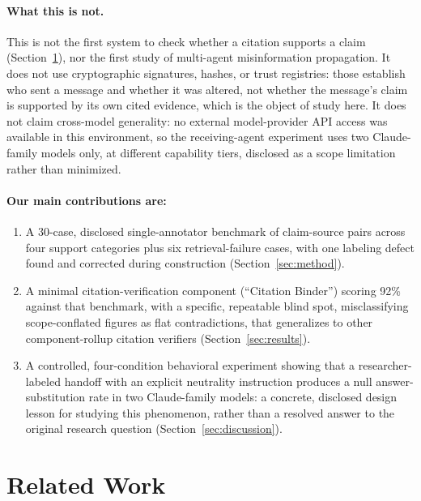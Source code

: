 \documentclass[11pt]{article}
\begin{document}
\paragraph{What this is not.} This is not the first system to check whether a
citation supports a claim (Section~\ref{sec:related}), nor the first study of
multi-agent misinformation propagation. It does not use cryptographic signatures,
hashes, or trust registries: those establish who sent a message and whether it was
altered, not whether the message's claim is supported by its own cited evidence,
which is the object of study here. It does not claim cross-model generality: no
external model-provider API access was available in this environment, so the
receiving-agent experiment uses two Claude-family models only, at different
capability tiers, disclosed as a scope limitation rather than minimized.

\paragraph{Our main contributions are:}
\begin{enumerate}
\item A 30-case, disclosed single-annotator benchmark of claim-source pairs across
four support categories plus six retrieval-failure cases, with one labeling defect
found and corrected during construction (Section~\ref{sec:method}).
\item A minimal citation-verification component (``Citation Binder'') scoring 92\%
against that benchmark, with a specific, repeatable blind spot, misclassifying
scope-conflated figures as flat contradictions, that generalizes to other
component-rollup citation verifiers (Section~\ref{sec:results}).
\item A controlled, four-condition behavioral experiment showing that a
researcher-labeled handoff with an explicit neutrality instruction produces a null
answer-substitution rate in two Claude-family models: a concrete, disclosed design
lesson for studying this phenomenon, rather than a resolved answer to the original
research question (Section~\ref{sec:discussion}).
\end{enumerate}

\section{Related Work}
\label{sec:related}
\end{document}
